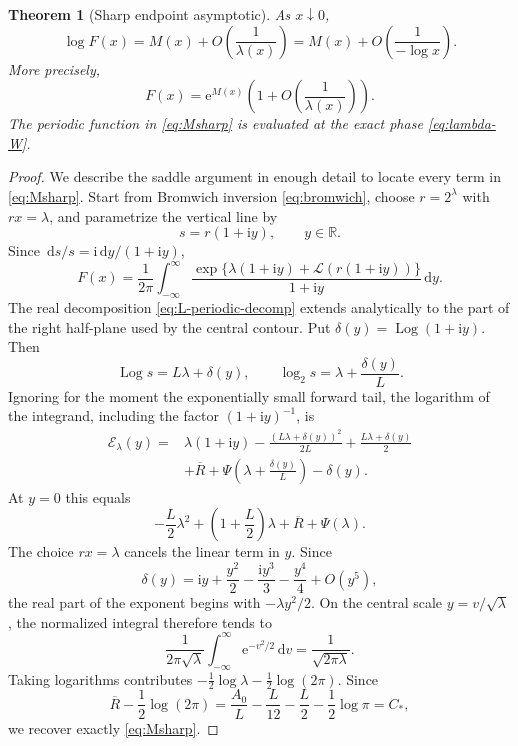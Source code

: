 \documentclass[11pt]{article}
\numberwithin{equation}{section}
\newtheorem{theorem}{Theorem}[section]
\theoremstyle{definition}
\theoremstyle{remark}
\DeclareMathOperator{\Log}{Log}
\newcommand{\R}{\mathbb{R}}
\newcommand{\dd}{\,\mathrm{d}}
\newcommand{\e}{\mathrm{e}}
\newcommand{\ii}{\mathrm{i}}
\begin{document}
\begin{theorem}[Sharp endpoint asymptotic]\label{thm:sharp-main}
As $x\downarrow0$,
\begin{equation}\label{eq:sharp-log}
 \log F(x)=M(x)+O\left(\frac1{\lambda(x)}\right)
          =M(x)+O\left(\frac1{-\log x}\right).
\end{equation}
More precisely,
\begin{equation}\label{eq:sharp-ratio}
 F(x)=\e^{M(x)}\left(1+O\left(\frac1{\lambda(x)}\right)\right).
\end{equation}
The periodic function in \eqref{eq:Msharp} is evaluated at the exact phase
\eqref{eq:lambda-W}.
\end{theorem}

\begin{proof}
We describe the saddle argument in enough detail to locate every term in
\eqref{eq:Msharp}.  Start from Bromwich inversion \eqref{eq:bromwich}, choose
$r=2^\lambda$ with $rx=\lambda$, and parametrize the vertical line by
\[
 s=r(1+\ii y),\qquad y\in\R.
\]
Since $\dd s/s=\ii\dd y/(1+\ii y)$,
\begin{equation}\label{eq:bromwich-y}
 F(x)=\frac1{2\pi}\int_{-\infty}^{\infty}
 \frac{\exp\{\lambda(1+\ii y)+\mathscr L(r(1+\ii y))\}}
      {1+\ii y}\dd y.
\end{equation}
The real decomposition \eqref{eq:L-periodic-decomp} extends analytically to
the part of the right half-plane used by the central contour.  Put
$\delta(y)=\Log(1+\ii y)$.  Then
\[
 \Log s=L\lambda+\delta(y),
 \qquad
 \log_2s=\lambda+\frac{\delta(y)}L.
\]
Ignoring for the moment the exponentially small forward tail, the logarithm
of the integrand, including the factor $(1+\ii y)^{-1}$, is
\begin{equation}\label{eq:central-exponent}
 \begin{split}
 \mathcal E_\lambda(y)={}&\lambda(1+\ii y)
 -\frac{(L\lambda+\delta(y))^2}{2L}
 +\frac{L\lambda+\delta(y)}2\\
 &+\overline R
 +\Psi\left(\lambda+\frac{\delta(y)}L\right)-\delta(y).
 \end{split}
\end{equation}
At $y=0$ this equals
\begin{equation}\label{eq:central-height}
 -\frac L2\lambda^2+
 \left(1+\frac L2\right)\lambda+
 \overline R+\Psi(\lambda).
\end{equation}
The choice $rx=\lambda$ cancels the linear term in $y$.  Since
\[
 \delta(y)=\ii y+\frac{y^2}{2}-\frac{\ii y^3}{3}
             -\frac{y^4}{4}+O(y^5),
\]
the real part of the exponent begins with
$-\lambda y^2/2$.  On the central scale $y=v/\sqrt\lambda$, the normalized
integral therefore tends to
\[
 \frac1{2\pi\sqrt\lambda}
 \int_{-\infty}^{\infty}\e^{-v^2/2}\dd v
 =\frac1{\sqrt{2\pi\lambda}}.
\]
Taking logarithms contributes
$-\frac12\log\lambda-\frac12\log(2\pi)$.  Since
\[
 \overline R-\frac12\log(2\pi)
 =\frac{A_0}{L}-\frac{L}{12}-\frac L2-\frac12\log\pi=C_*,
\]
we recover exactly \eqref{eq:Msharp}.


\end{proof}
\end{document}

